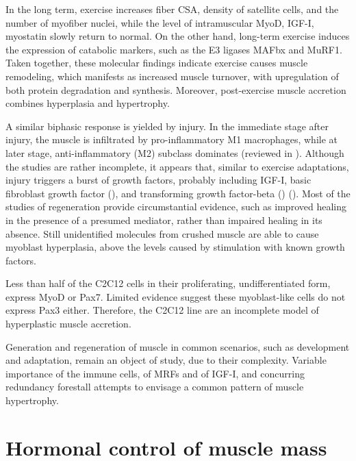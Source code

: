 \documentclass[12pt,english]{report}\usepackage[]{graphicx}\usepackage[]{color}
\begin{document}
In the long term, exercise increases fiber CSA, density of satellite
cells, and the number of myofiber nuclei, while the level of intramuscular
MyoD, IGF-I, myostatin slowly return to normal\citep{hanssen2013effect}.
On the other hand, long-term exercise induces the expression of catabolic
markers, such as the E3 ligases MAFbx and MuRF1\citep{stefanetti2014regulation}.
Taken together, these molecular findings indicate exercise causes
muscle remodeling, which manifests as increased muscle turnover, with
upregulation of both protein degradation and synthesis. Moreover,
post-exercise muscle accretion combines hyperplasia and hypertrophy.

A similar biphasic response is yielded by injury. In the immediate
stage after injury, the muscle is infiltrated by pro-inflammatory
M1 macrophages, while at later stage, anti-inflammatory (M2) subclass
dominates (reviewed in \citep{rigamonti2014macrophage}). Although
the studies are rather incomplete, it appears that, similar to exercise
adaptations, injury triggers a burst of growth factors, probably including
IGF-I, basic fibroblast growth factor (),
and transforming growth factor-beta ()
(\citep{robertson1993role}). Most of the studies of regeneration
provide circumstantial evidence, such as improved healing in the presence
of a presumed mediator, rather than impaired healing in its absence.
Still unidentified molecules from crushed muscle are able to cause
myoblast hyperplasia, above the levels caused by stimulation with
known growth factors\citep{haugk1995regulation}. 

Less than half of the C2C12 cells in their proliferating, undifferentiated
form, express MyoD or Pax7\citep{olguin2004pax-7}. Limited evidence
suggest these myoblast-like cells do not express Pax3 either\citep{epstein1995pax3}.
Therefore, the C2C12 line are an incomplete model of hyperplastic
muscle accretion.

Generation and regeneration of muscle in common scenarios, such as
development and adaptation, remain an object of study, due to their
complexity. Variable importance of the immune cells, of MRFs and of
IGF-I, and concurring redundancy forestall attempts to envisage a
common pattern of muscle hypertrophy.


\section{Hormonal control of muscle mass}
\end{document}
